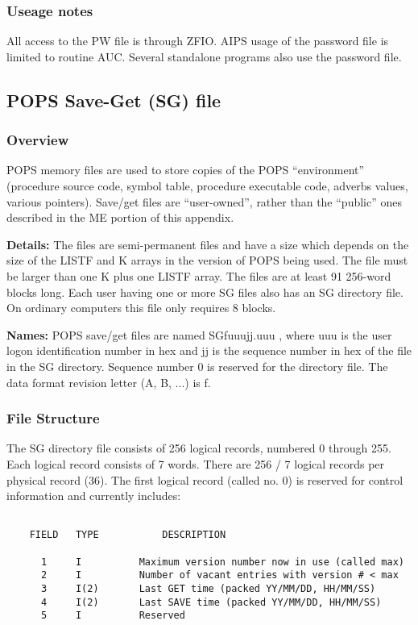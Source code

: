 \subsubsection{Useage notes}

     All access to the PW file is through ZFIO.  AIPS usage of the
password file is limited to routine AUC.  Several standalone programs
also use the password file.
\subsection{POPS Save-Get (SG) file}
\subsubsection{Overview}


 POPS memory files are used to store copies of the POPS
``environment'' (procedure source code, symbol table, procedure
executable code, adverbs values, various pointers).  Save/get files
are ``user-owned'', rather than the ``public'' ones described in the ME
portion of this appendix.

{\bf Details:}  The files are semi-permanent files and
have a size which depends on the size of the LISTF and K arrays in the
version of POPS being used.  The file must be larger than one K plus
one LISTF array.   The files are at least 91
256-word blocks long.  Each user having one or more SG files also has
an SG directory file.  On ordinary computers this file only requires
8 blocks.

{\bf Names:}  POPS save/get files are named SGfuuujj.uuu , where uuu is the
user logon identification number in hex and jj is the sequence number
in hex of the file in the SG directory.  Sequence number 0 is reserved
for the directory file.  The  data format revision letter (A, B, ...) is f.


\subsubsection{File Structure}


     The SG directory file consists of 256 logical records, numbered
0 through 255.  Each logical record consists of 7 words.  There are
256 / 7 logical records per physical record (36).  The first logical
record (called no. 0) is reserved for control information and currently
includes:
\begin{verbatim}

    FIELD   TYPE           DESCRIPTION

      1     I          Maximum version number now in use (called max)
      2     I          Number of vacant entries with version # < max
      3     I(2)       Last GET time (packed YY/MM/DD, HH/MM/SS)
      4     I(2)       Last SAVE time (packed YY/MM/DD, HH/MM/SS)
      5     I          Reserved
\end{verbatim}

